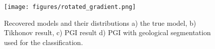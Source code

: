 \begin{figure}[htb]
    \vspace{-0.1cm}
    \begin{center}
    \texttt{[image: figures/rotated\_gradient.png]}
    \end{center}
    \vspace{-0.5cm}
\caption{
    Recovered models and their distributions a) the true model, b) Tikhonov result, c) PGI result d) PGI with geological segmentation used for the classification.
}
\label{fig:data-normalizations}
\vspace{-0.1cm}
\end{figure}